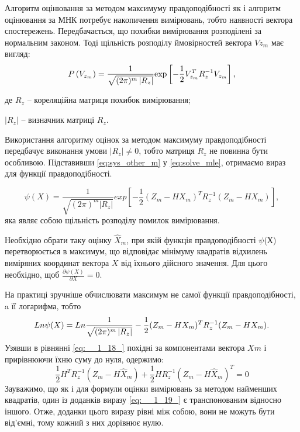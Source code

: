 Алгоритм оцінювання за методом максимуму правдоподібності  як і алгоритм оцінювання 
за МНК потребує накопичення вимірювань, тобто наявності вектора спостережень.
Передбачається, що похибки вимірювання розподілені за нормальним законом. Тоді щільність 
розподілу ймовірностей вектора  $Vz_m$ має вигляд:
\begin{equation}
P\left(V_{z_{m} } \right)=\frac{1}{\sqrt{(2\pi)^{m} \left|R_{z} \right|} 
} {\rm exp}\left[-\frac{1}{2} V_{z_{m} }^{T} R_{z}^{-1} V_{z_{m} } \right],                       
\label{eq:solve_mle}
\end{equation}
\begin{ESKDexplanation}
\item де $R_z$ -- кореляційна матриця похибок вимірювання; 
\item $|R_z|$ -- визначник матриці $R_z$.                                                   
\end{ESKDexplanation}
Використання алгоритму оцінок за методом максимуму правдоподібності передбачує виконання умови 
$|R_z|\neq 0$, тобто матриця $R_z$ не повинна бути 
особливою. Підставивши \eqref{eq:sys_other_m} у \eqref{eq:solve_mle}, отримаємо 
вираз для функції правдоподібності.

\[\psi (X)=\frac{1}{\sqrt{(2\pi )^{m} \left|R_{z} \right|} } exp \left[-\frac{1}{2} 
(Z_{m} -HX_{m} )^{T} R_{z}^{-1} (Z_{m} -HX_{m} )\right],\] 
яка являє собою щільність розподілу помилок  вимірювання.

Необхідно обрати таку оцінку  $\hat{X}_{m}$, при якій функція 
правдоподібності $ \psi$(Х) перетворюється в максимум, що відповідає 
мінімуму квадратів відхилень виміряних координат вектора $X$ від їхнього дійсного значення. 
Для цього необхідно, щоб $\frac{\partial \psi (X)}{\partial X} =0$.

На практиці зручніше обчислювати максимум не самої функції правдоподібності, a її 
логарифма, тобто 
\begin{equation}
Ln \psi (X)= Ln\frac{1}{\sqrt{(2{\rm 
\pi })^{m} \left|R_{z} \right|} } -\frac{1}{2} (Z_{m} -HX_{m} )^{T} R_{z}^{-1} 
(Z_{m} -HX_{m} ).       
\label{eq:__1_18_}
\end{equation}
Узявши в рівнянні \eqref{eq:__1_18_} похідні за компонентами вектора $Xm$ 
і прирівнюючи їхню суму до нуля, одержимо:
\begin{equation}
\frac{1}{2} H^{T} R_{z}^{-1} (Z_{m} -H\hat{X}_{m} )+\frac{1}{2} 
HR_{z}^{-1} (Z_{m} -H\hat{X}_{m} )^{T} =0              
\label{eq:__1_19_}
\end{equation}
Зауважимо, що як і для формули оцінки вимірювань за методом найменших квадратів, один із доданків 
виразу \eqref{eq:__1_19_} є транспонованим відносно іншого. Отже, доданки цього 
виразу рівні між собою, вони не можуть бути від'ємні, тому кожний з них дорівнює 
нулю. 

